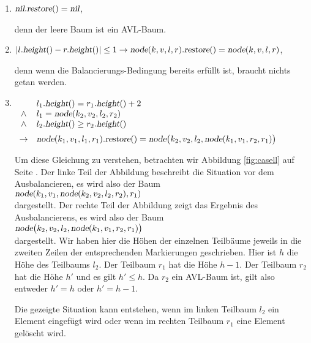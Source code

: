\begin{enumerate}
\item $\textsl{nil}.\textsl{restore}() = \textsl{nil}$,

      denn der leere Baum ist ein AVL-Baum.
\item $|l.\textsl{height}() - r.\textsl{height}()| \leq 1 \rightarrow \textsl{node}(k,v,l,r).\textsl{restore}() = \textsl{node}(k,v,l,r)$,

      denn wenn die Balancierungs-Bedingung bereits erf\"ullt ist,
      braucht nichts getan werden.
\item $\begin{array}[t]{cl}
              & l_1.\textsl{height}() = r_1.\textsl{height}() + 2    \\ 
       \wedge & l_1 = \textsl{node}(k_2,v_2,l_2,r_2)               \\
       \wedge & l_2.\textsl{height}() \geq r_2.\textsl{height}()     \\[0.2cm]
       \rightarrow & \textsl{node}(k_1,v_1,l_1,r_1).\textsl{restore}() = 
                     \textsl{node}\bigl(k_2,v_2,l_2,\textsl{node}(k_1,v_1,r_2,r_1)\bigr)
       \end{array}
      $

      Um diese Gleichung zu verstehen, betrachten wir Abbildung \ref{fig:casell}
      auf Seite \pageref{fig:casell}.  Der linke Teil der Abbildung beschreibt die
      Situation vor dem Ausbalancieren, es wird also der Baum \\[0.2cm]
      \hspace*{1.3cm} $\textsl{node}(k_1,v_1, \textsl{node}(k_2,v_2,l_2,r_2), r_1)$ \\[0.2cm]
      dargestellt.  Der rechte Teil der Abbildung zeigt das Ergebnis des
      Ausbalancierens, es wird also der Baum \\[0.2cm]
      \hspace*{1.3cm} $\textsl{node}\bigl(k_2,v_2,l_2,\textsl{node}(k_1,v_1,r_2,r_1)\bigr)$ \\[0.2cm]
      dargestellt. Wir haben hier die H\"ohen der einzelnen Teilb\"aume jeweils in die
      zweiten Zeilen der entsprechenden Markierungen geschrieben.  Hier ist $h$ die H\"ohe
      des Teilbaums $l_2$. Der Teilbaum $r_1$ hat die H\"ohe $h - 1$.  Der Teilbaum $r_2$
      hat die H\"ohe $h'$ und es gilt $h' \leq h$. Da $r_2$ ein AVL-Baum ist, gilt also
      entweder $h' = h$ oder $h' = h-1$.

      Die gezeigte Situation kann entstehen,
      wenn im linken Teilbaum $l_2$ ein Element eingef\"ugt wird oder wenn im rechten
      Teilbaum $r_1$ eine Element gel\"oscht wird.


\end{enumerate}
